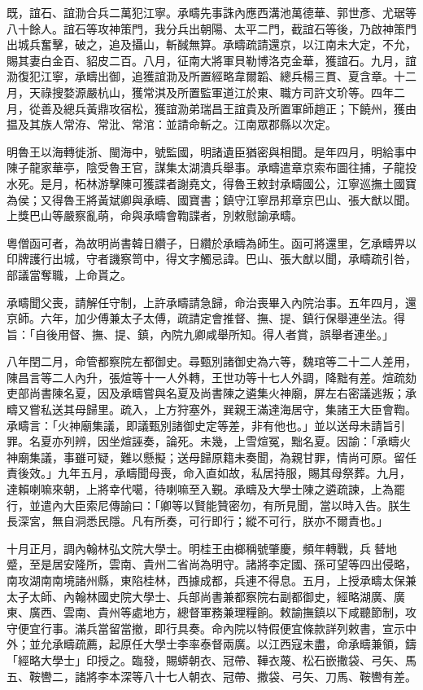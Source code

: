 \begin{pinyinscope}
既，誼石、誼泐合兵二萬犯江寧。承疇先事誅內應西溝池萬德華、郭世彥、尤琚等八十餘人。誼石等攻神策門，我分兵出朝陽、太平二門，截誼石等後，乃啟神策門出城兵奮擊，破之，追及攝山，斬馘無算。承疇疏請還京，以江南未大定，不允，賜其妻白金百、貂皮二百。八月，征南大將軍貝勒博洛克金華，獲誼石。九月，誼泐復犯江寧，承疇出御，追獲誼泐及所置經略韋爾韜、總兵楊三貫、夏含章。十二月，天祿搜婺源嚴杭山，獲常淇及所置監軍道江於東、職方司許文玠等。四年二月，從善及總兵黃鼎攻宿松，獲誼泐弟瑞昌王誼貴及所置軍師趙正；下饒州，獲由揾及其族人常洊、常沘、常涫：並請命斬之。江南眾郡縣以次定。

明魯王以海轉徙浙、閩海中，號監國，明諸遺臣猶密與相聞。是年四月，明給事中陳子龍家華亭，陰受魯王官，謀集太湖潰兵舉事。承疇遣章京索布圖往捕，子龍投水死。是月，柘林游擊陳可獲諜者謝堯文，得魯王敕封承疇國公，江寧巡撫土國寶為侯；又得魯王將黃斌卿與承疇、國寶書；鎮守江寧昂邦章京巴山、張大猷以聞。上獎巴山等嚴察亂萌，命與承疇會鞫諜者，別敕慰諭承疇。

粵僧函可者，為故明尚書韓日纘子，日纘於承疇為師生。函可將還里，乞承疇畀以印牌護行出城，守者譏察笥中，得文字觸忌諱。巴山、張大猷以聞，承疇疏引咎，部議當奪職，上命貰之。

承疇聞父喪，請解任守制，上許承疇請急歸，命治喪畢入內院治事。五年四月，還京師。六年，加少傅兼太子太傅，疏請定會推督、撫、提、鎮行保舉連坐法。得旨：「自後用督、撫、提、鎮，內院九卿咸舉所知。得人者賞，誤舉者連坐。」

八年閏二月，命管都察院左都御史。尋甄別諸御史為六等，魏琯等二十二人差用，陳昌言等二人內升，張煊等十一人外轉，王世功等十七人外調，降黜有差。煊疏劾吏部尚書陳名夏，因及承疇嘗與名夏及尚書陳之遴集火神廟，屏左右密議逃叛；承疇又嘗私送其母歸里。疏入，上方狩塞外，巽親王滿達海居守，集諸王大臣會鞫。承疇言：「火神廟集議，即議甄別諸御史定等差，非有他也。」並以送母未請旨引罪。名夏亦列辨，因坐煊誣奏，論死。未幾，上雪煊冤，黜名夏。因諭：「承疇火神廟集議，事雖可疑，難以懸擬；送母歸原籍未奏聞，為親甘罪，情尚可原。留任責後效。」九年五月，承疇聞母喪，命入直如故，私居持服，賜其母祭葬。九月，達賴喇嘛來朝，上將幸代噶，待喇嘛至入覲。承疇及大學士陳之遴疏諫，上為罷行，並遣內大臣索尼傳諭曰：「卿等以賢能贊密勿，有所見聞，當以時入告。朕生長深宮，無自洞悉民隱。凡有所奏，可行即行；縱不可行，朕亦不爾責也。」

十月正月，調內翰林弘文院大學士。明桂王由榔稱號肇慶，頻年轉戰，兵朁地蹙，至是居安隆所，雲南、貴州二省尚為明守。諸將李定國、孫可望等四出侵略，南攻湖南南境諸州縣，東陷桂林，西據成都，兵連不得息。五月，上授承疇太保兼太子太師、內翰林國史院大學士、兵部尚書兼都察院右副都御史，經略湖廣、廣東、廣西、雲南、貴州等處地方，總督軍務兼理糧餉。敕諭撫鎮以下咸聽節制，攻守便宜行事。滿兵當留當撤，即行具奏。命內院以特假便宜條款詳列敕書，宣示中外；並允承疇疏薦，起原任大學士李率泰督兩廣。以江西寇未盡，命承疇兼領，鑄「經略大學士」印授之。臨發，賜蟒朝衣、冠帶、鞾衣蔑、松石嵌撒袋、弓矢、馬五、鞍轡二，諸將李本深等八十七人朝衣、冠帶、撒袋、弓矢、刀馬、鞍轡有差。


\end{pinyinscope}
